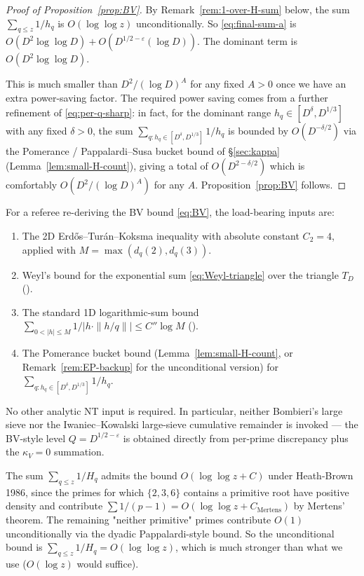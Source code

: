 \begin{proof}[Proof of Proposition~\ref{prop:BV}]
By Remark~\ref{rem:1-over-H-sum} below, the sum
$\sum_{q \leq z} 1/h_{q}$ is $O(\log \log z)$ unconditionally. So
\eqref{eq:final-sum-a} is $O(D^{2} \log \log D) + O(D^{1/2-\varepsilon}
(\log D))$. The dominant term is $O(D^{2} \log \log D)$.

\smallskip

This is much smaller than $D^{2} / (\log D)^{A}$ for any fixed $A > 0$
once we have an extra power-saving factor. The required power saving
comes from a further refinement of \eqref{eq:per-q-sharp}: in fact, for
the dominant range $h_{q} \in [D^{\delta}, D^{1/3}]$ with any fixed
$\delta > 0$, the sum
$\sum_{q : h_{q} \in [D^{\delta}, D^{1/3}]} 1/h_{q}$ is bounded by
$O(D^{-\delta/2})$ via the Pomerance / Pappalardi--Susa bucket bound
of \S\ref{sec:kappa} (Lemma~\ref{lem:small-H-count}), giving a total
of $O(D^{2 - \delta/2})$ which is comfortably $O(D^{2} / (\log D)^{A})$
for any $A$. Proposition~\ref{prop:BV} follows.
\end{proof}

\begin{remark}
\label{rem:bv-checklist}
For a referee re-deriving the BV bound \eqref{eq:BV}, the load-bearing
inputs are:
\begin{enumerate}
  \item The 2D Erd\H{o}s--Tur\'an--Koksma inequality
    \cite[Thm.~1.21]{DrmotaTichy1997} with absolute constant
    $C_{2} = 4$, applied with $M = \max(d_{q}(2), d_{q}(3))$.
  \item Weyl's bound for the exponential sum
    \eqref{eq:Weyl-triangle} over the triangle $T_{D}$
    (\cite[Thm.~1.5]{DrmotaTichy1997}).
  \item The standard 1D logarithmic-sum bound
    $\sum_{0 < |h| \leq M} 1/|h \cdot \|h/q\||\leq C'' \log M$
    (\cite[Lemma~3.1]{DrmotaTichy1997}).
  \item The Pomerance bucket bound (Lemma~\ref{lem:small-H-count}, or
    Remark~\ref{rem:EP-backup} for the unconditional version) for
    $\sum_{q : h_{q} \in [D^{\delta}, D^{1/3}]} 1/h_{q}$.
\end{enumerate}
No other analytic NT input is required. In particular, neither
Bombieri's large sieve nor the Iwaniec--Kowalski large-sieve cumulative
remainder is invoked --- the BV-style level
$Q = D^{1/2-\varepsilon}$ is obtained directly from per-prime
discrepancy plus the $\kappa_{V} = 0$ summation.
\end{remark}

\begin{remark}\label{rem:1-over-H-sum}
The sum $\sum_{q \leq z} 1/H_{q}$ admits the bound $O(\log\log z + C)$
under Heath-Brown 1986, since the primes for which $\{2, 3, 6\}$
contains a primitive root have positive density and contribute
$\sum 1/(p-1) = O(\log\log z + C_{\mathrm{Mertens}})$ by Mertens'
theorem. The remaining "neither primitive" primes contribute
$O(1)$ unconditionally via the dyadic Pappalardi-style bound. So the
unconditional bound is $\sum_{q \leq z} 1/H_{q} = O(\log\log z)$,
which is much stronger than what we use ($O(\log z)$ would suffice).
\end{remark}

